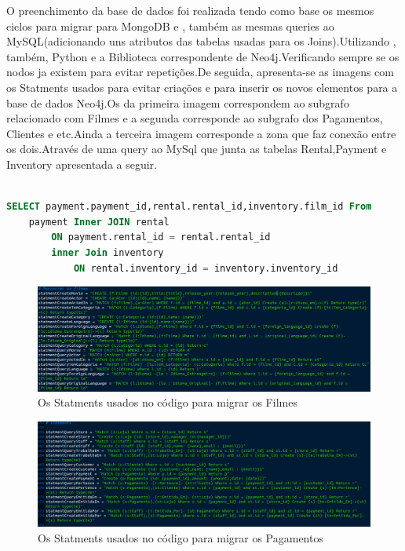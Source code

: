 O preenchimento da base de dados foi realizada tendo como base os mesmos ciclos para migrar para MongoDB e , também as mesmas queries ao MySQL(adicionando uns atributos das tabelas usadas para os Joins).Utilizando , também, Python e a Biblioteca correspondente de Neo4j.Verificando sempre se os nodos ja existem para evitar repetições.De seguida, apresenta-se as imagens com os Statments usados para evitar criações e para inserir os novos elementos para a base de dados Neo4j.Os da primeira imagem correspondem ao subgrafo relacionado com Filmes e a segunda corresponde ao subgrafo dos Pagamentos, Clientes e etc.Ainda a terceira imagem corresponde a zona que faz conexão entre os dois.Através de uma query ao MySql que junta as tabelas Rental,Payment e Inventory apresentada a seguir.

\begin{lstlisting}[language=sql,caption=Query ao MySQL para fazer a conexão entre os dois subgrafos]

SELECT payment.payment_id,rental.rental_id,inventory.film_id From 
	payment Inner JOIN rental 
		ON payment.rental_id = rental.rental_id 
		inner Join inventory 
			ON rental.inventory_id = inventory.inventory_id

\end{lstlisting}

\begin{figure}[H]

  \centering

  \includegraphics[width=\textwidth]{FilmesStatment.png}

  \caption {Os Statments usados no código para migrar os Filmes}

  \label {fig:FilmStatment}

\end{figure}

\begin{figure}[H]

  \centering

  \includegraphics[width=\textwidth]{PagamentosStatment.png}

  \caption {Os Statments usados no código para migrar os Pagamentos}

  \label {fig:PagamentoStatment}

\end{figure}

